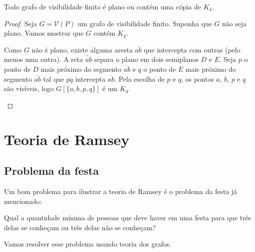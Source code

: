\begin{teorema}\label{planork4}
    Todo grafo de visibilidade finito é plano ou contém uma cópia de $K_4$.
\end{teorema}
\begin{proof}
    Seja $G=\mathcal V(P)$ um grafo de visibilidade finito. Suponha que $G$ não seja plano. Vamos mostrar que $G$ contém $K_4$.

    Como $G$ não é plano, existe alguma aresta $\overline{ab}$ que intercepta com outras (pelo menos uma outra). A reta $\overleftrightarrow{ab}$ separa o plano em dois semiplanos $D$ e $E$. Seja $p$ o ponto de $D$ mais próximo do segmento $\overline{ab}$ e $q$ o ponto de $E$ mais próximo do segmento $\overline{ab}$ tal que $\overline{pq}$ intercepta $\overline{ab}$. Pela escolha de $p$ e $q$, os pontos $a$, $b$, $p$ e $q$ são visíveis, logo $G[\{a,b,p,q\}]$ é um $K_4$.
    \begin{center}
    \end{center}
\end{proof}

\section {Teoria de Ramsey}

\subsection {Problema da festa}
Um bom problema para ilustrar a teoria de Ramsey é o problema da festa já mencionado:

\begin{problem}
    Qual a quantidade mínima de pessoas que deve haver em uma festa para que três delas se conheçam ou três delas não se conheçam?
\end{problem}

Vamos resolver esse problema usando teoria dos grafos.

